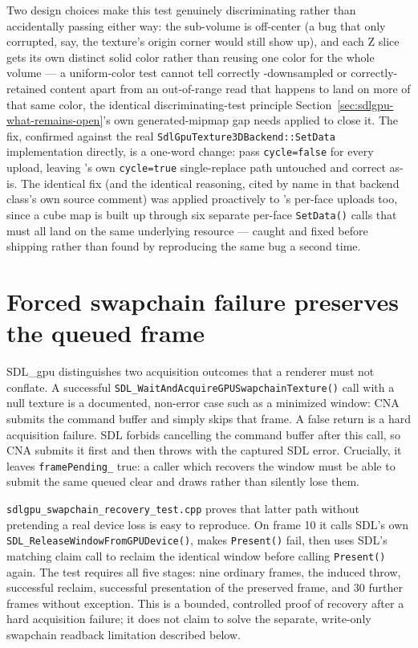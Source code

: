 Two design choices make this test genuinely discriminating rather than accidentally passing
either way: the sub-volume is off-center (a bug that only corrupted, say, the texture's
origin corner would still show up), and each Z slice gets its own distinct solid color rather
than reusing one color for the whole volume --- a uniform-color test cannot tell correctly
-downsampled or correctly-retained content apart from an out-of-range read that happens to
land on more of that same color, the identical discriminating-test principle
Section~\ref{sec:sdlgpu-what-remains-open}'s own generated-mipmap gap needs applied to close it.
The fix, confirmed against the real
\texttt{SdlGpuTexture3DBackend::\allowbreak{}SetData} implementation
directly, is a one-word change: pass \texttt{cycle=false} for every 
upload, leaving 's own \texttt{cycle=true} single-replace path untouched
and correct as-is. The identical fix (and the identical reasoning, cited by name in that
backend class's own source comment) was applied proactively to
's per-face uploads too, since a cube map is built up through six
separate per-face \texttt{SetData()} calls that must all land on the same underlying resource --- caught
and fixed before shipping rather than found by reproducing the same bug a second time.

\section{Forced swapchain failure preserves the queued frame}

SDL\_gpu distinguishes two acquisition outcomes that a renderer must not conflate. A successful
\texttt{SDL\_WaitAndAcquireGPUSwapchainTexture()} call with a null texture is a documented,
non-error case such as a minimized window: CNA submits the command buffer and simply skips that
frame. A false return is a hard acquisition failure. SDL forbids cancelling the command buffer
after this call, so CNA submits it first and then throws with the captured SDL error. Crucially,
it leaves \texttt{framePending\_} true: a caller which recovers the window must be able to submit
the same queued clear and draws rather than silently lose them.

\texttt{sdlgpu\_\allowbreak swapchain\_\allowbreak recovery\_\allowbreak test.cpp} proves that latter path without pretending a real
device loss is easy to reproduce. On frame 10 it calls SDL's own
\texttt{SDL\_\allowbreak ReleaseWindow\allowbreak FromGPU\allowbreak Device()}, makes \texttt{Present()} fail, then
uses SDL's matching claim call to reclaim the identical window before calling \texttt{Present()}
again. The test
requires all five stages: nine ordinary frames, the induced throw, successful reclaim, successful
presentation of the preserved frame, and 30 further frames without exception. This is a bounded,
controlled proof of recovery after a hard acquisition failure; it does not claim to solve the
separate, write-only swapchain readback limitation described below.

